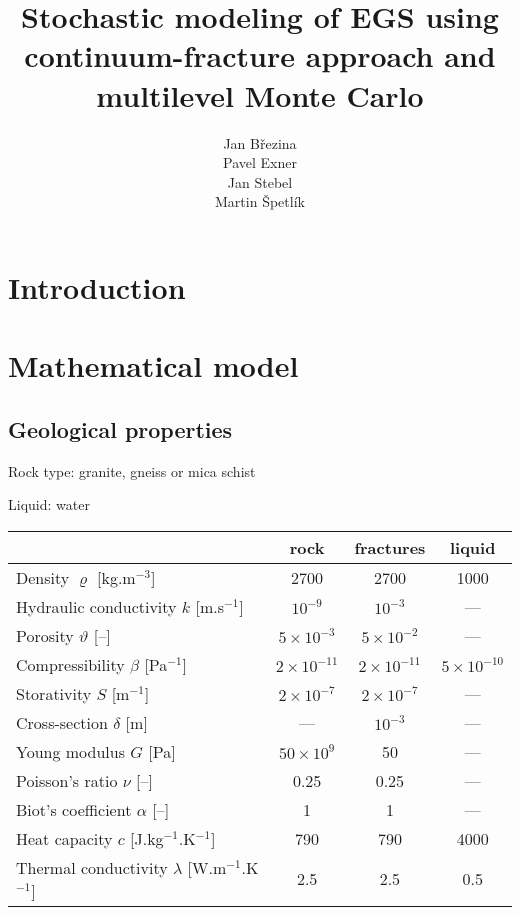 \documentclass{article}
\title{Stochastic modeling of EGS using continuum-fracture approach and multilevel Monte Carlo}
\author{
  Jan Březina \\
  \And
  Pavel Exner \\
  \And
  Jan Stebel \\
  \And
  Martin Špetlík \\
}
\begin{document}
\maketitle

\begin{abstract}

\end{abstract}




\section{Introduction}



\section{Mathematical model}

\subsection{Geological properties}

Rock type: granite, gneiss or mica schist \cite{capova} %

Liquid: water

\begin{tabular}{|l|c|c|c|}
\hline
 & rock & fractures & liquid\\\hline
Density $\varrho$ [kg.m${}^{-3}$] & 2700 & 2700 & 1000 \\
Hydraulic conductivity $k$ [m.s${}^{-1}$] & $10^{-9}$ \cite{sperl-trckova} & $10^{-3}$ & ---\\
Porosity $\vartheta$ [--] & $5\times10^{-3}$ \cite{intera} & $5\times10^{-2}$ & --- \\
Compressibility $\beta$ [Pa${}^{-1}$] & $2\times10^{-11}$ \cite{zisman} & $2\times10^{-11}$ & $5\times10^{-10}$ \\
Storativity $S$ [m${}^{-1}$] & $2\times10^{-7}$ & $2\times10^{-7}$ & --- \\
Cross-section $\delta$ [m] & --- & $10^{-3}$ & --- \\
\hline
Young modulus $G$ [Pa] & $50\times10^9$ \cite{ljunggren} & 50 & --- \\
Poisson's ratio $\nu$ [--] & 0.25 \cite{ljunggren} & 0.25 & --- \\
Biot's coefficient $\alpha$ [--] & 1 & 1 & --- \\
\hline
Heat capacity $c$ [J.kg${}^{-1}$.K${}^{-1}$] & 790 & 790 & 4000 \\
Thermal conductivity $\lambda$ [W.m${}^{-1}$.K${}^{-1}$] & 2.5 & 2.5 & 0.5 \\
\hline
\end{tabular}
\end{document}
